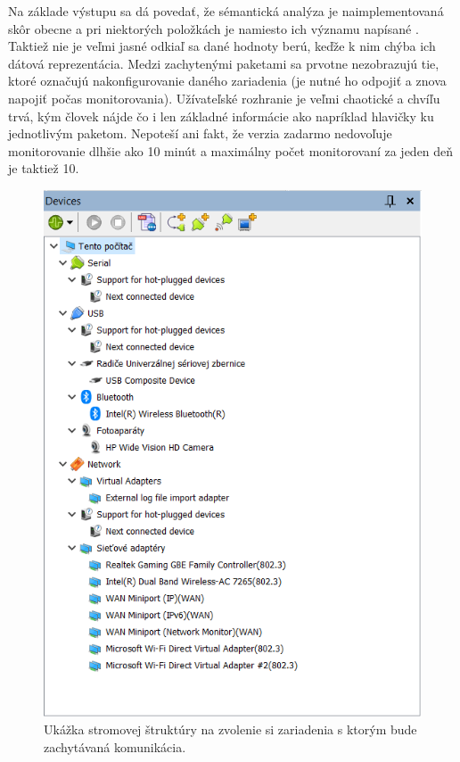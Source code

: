 Na základe výstupu sa dá povedať, že sémantická analýza je naimplementovaná skôr obecne a pri niektorých položkách je namiesto ich významu napísané . Taktiež nie je veľmi jasné odkiaľ sa dané hodnoty berú, keďže k nim chýba ich dátová reprezentácia. Medzi zachytenými paketami sa prvotne nezobrazujú tie, ktoré označujú nakonfigurovanie daného zariadenia (je nutné ho odpojiť a znova napojiť počas monitorovania). Užívateľské rozhranie je veľmi chaotické a chvíľu trvá, kým človek nájde čo i len základné informácie ako napríklad hlavičky ku jednotlivým paketom.  Nepoteší ani fakt, že verzia zadarmo nedovoľuje monitorovanie dlhšie ako 10 minút a maximálny počet monitorovaní za jeden deň je taktiež 10.

\newpage

\begin{figure}[!htb]\centering
\includegraphics[width=\textwidth]{img/uvod_treeview.png}
\caption{Ukážka stromovej štruktúry na zvolenie si zariadenia s ktorým bude zachytávaná komunikácia.}
\label{obr:uvod:treeview}
\end{figure}

